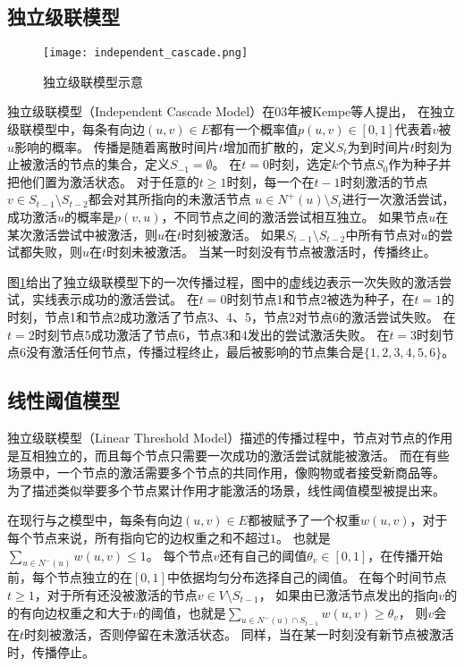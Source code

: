 \subsection{独立级联模型}
\begin{figure}[h]
	\centering
	\texttt{[image: independent\_cascade.png]}
	\caption{独立级联模型示意}\label{fig:independent_cascade}
\end{figure}
独立级联模型（Independent Cascade Model）在03年被Kempe等人\cite{Kempe2003maximizing}提出，
在独立级联模型中，每条有向边$(u,v) \in E$都有一个概率值$p(u,v) \in [0,1]$代表着$v$被$u$影响的概率。
传播是随着离散时间片$t$增加而扩散的，定义$S_t$为到时间片$t$时刻为止被激活的节点的集合，定义$S_{-1}=\emptyset$。
在$t=0$时刻，选定$k$个节点$S_0$作为种子并把他们置为激活状态。
对于任意的$t\geq 1$时刻，每一个在$t-1$时刻激活的节点$v \in S_{t-1} \setminus S_{t-2}$都会对其所指向的未激活节点
$u \in N^+(u) \setminus S_{t}$进行一次激活尝试，成功激活$u$的概率是$p(v,u)$，不同节点之间的激活尝试相互独立。
如果节点$u$在某次激活尝试中被激活，则$u$在$t$时刻被激活。
如果$S_{t-1} \setminus S_{t-2}$中所有节点对$u$的尝试都失败，则$u$在$t$时刻未被激活。
当某一时刻没有节点被激活时，传播终止。

图\ref{fig:independent_cascade}给出了独立级联模型下的一次传播过程，图中的虚线边表示一次失败的激活尝试，实线表示成功的激活尝试。
在$t=0$时刻节点1和节点2被选为种子，在$t=1$的时刻，节点1和节点2成功激活了节点3、4、5，节点2对节点6的激活尝试失败。
在$t=2$时刻节点5成功激活了节点6，节点3和4发出的尝试激活失败。
在$t=3$时刻节点6没有激活任何节点，传播过程终止，最后被影响的节点集合是$\{1,2,3,4,5,6\}$。

\subsection{线性阈值模型}
独立级联模型（Linear Threshold Model）\cite{Kempe2003maximizing}描述的传播过程中，节点对节点的作用是互相独立的，而且每个节点只需要一次成功的激活尝试就能被激活。
而在有些场景中，一个节点的激活需要多个节点的共同作用，像购物或者接受新商品等。
为了描述类似举要多个节点累计作用才能激活的场景，线性阈值模型被提出来。

在现行与之模型中，每条有向边$(u,v) \in E$都被赋予了一个权重$w(u,v)$，对于每个节点来说，所有指向它的边权重之和不超过$1$。
也就是$\sum_{u \in N^-(u)} w(u,v) \leq 1$。
每个节点$v$还有自己的阈值$\theta_v \in [0,1]$，在传播开始前，每个节点独立的在$[0,1]$中依据均匀分布选择自己的阈值。
在每个时间节点$t \geq 1$，对于所有还没被激活的节点$v \in V \setminus S_{t-1}$，
如果由已激活节点发出的指向$v$的的有向边权重之和大于$v$的阈值，也就是$\sum_{u \in N^-(u) \cap S_{t-1}} w(u,v) \geq \theta_v$，
则$v$会在$t$时刻被激活，否则停留在未激活状态。
同样，当在某一时刻没有新节点被激活时，传播停止。

